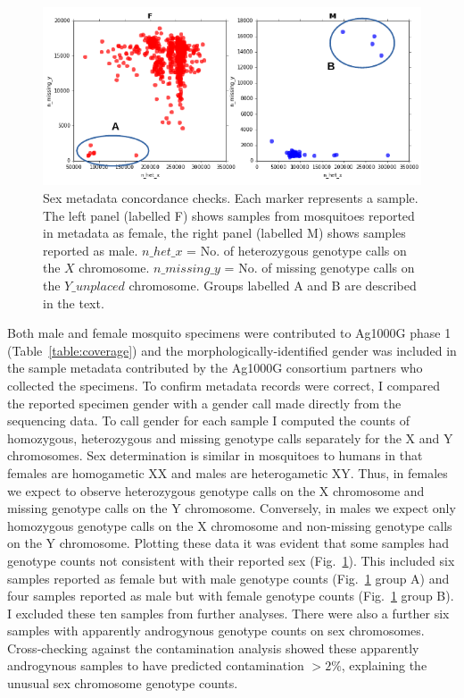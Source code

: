 \begin{refsection}
\begin{figure}[t!]
\centering
\includegraphics[width=\textwidth]{artwork/chapter3/sex.pdf}
\caption{Sex metadata concordance checks.
%
Each marker represents a sample.
%
The left panel (labelled F) shows samples from mosquitoes reported in metadata as female, the right panel (labelled M) shows samples reported as male.
%
$n\_het\_x$ = No. of heterozygous genotype calls on the $X$ chromosome.
%
$n\_missing\_y$ = No. of missing genotype calls on the $Y\_unplaced$ chromosome.
%
Groups labelled A and B are described in the text.
%
}
%
\label{fig:ch3-sex}
\end{figure}


Both male and female mosquito specimens were contributed to Ag1000G phase 1 (Table~\ref{table:coverage}) and the morphologically-identified gender was included in the sample metadata contributed by the Ag1000G consortium partners who collected the specimens.
%
To confirm metadata records were correct, I compared the reported specimen gender with a gender call made directly from the sequencing data.
%
To call gender for each sample I computed the counts of homozygous, heterozygous and missing genotype calls separately for the X and Y chromosomes. 
%
Sex determination is similar in mosquitoes to humans in that females are homogametic XX and males are heterogametic XY.
%
Thus, in females we expect to observe heterozygous genotype calls on the X chromosome and missing genotype calls on the Y chromosome.
%
Conversely, in males we expect only homozygous genotype calls on the X chromosome and non-missing genotype calls on the Y chromosome.
%
Plotting these data it was evident that some samples had genotype counts not consistent with their reported sex (Fig.~\ref{fig:ch3-sex}).
%
This included six samples reported as female but with male genotype counts (Fig.~\ref{fig:ch3-sex} group A) and four samples reported as male but with female genotype counts (Fig.~\ref{fig:ch3-sex} group B).
%
I excluded these ten samples from further analyses.
%
There were also a further six samples with apparently androgynous genotype counts on sex chromosomes.
%
Cross-checking against the contamination analysis showed these apparently androgynous samples to have predicted contamination $>2\%$, explaining the unusual sex chromosome genotype counts.



\end{refsection}
